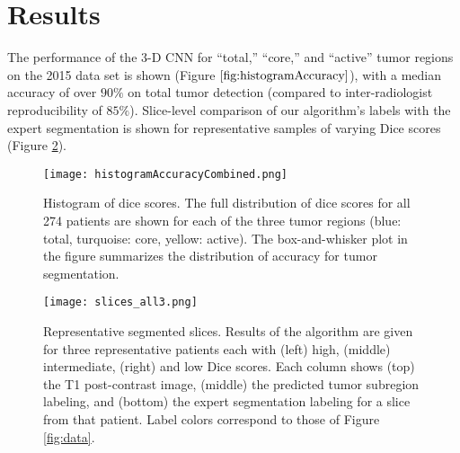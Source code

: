 \documentclass{llncs}
\begin{document}
\section{Results}
The performance of the 3-D CNN  for ``total,'' ``core,'' and ``active'' tumor regions on the 2015 data set is shown (Figure $\ref{fig:histogramAccuracy}$), with a median accuracy of over $90\%$ on total tumor detection (compared to inter-radiologist reproducibility of $85\%$).  Slice-level comparison of our algorithm's labels with the expert segmentation is shown for representative samples of varying Dice scores (Figure \ref{fig:results}). \\
\begin{figure}[htb]
	\centering
	\texttt{[image: histogramAccuracyCombined.png]}
	\caption{{Histogram of dice scores.} \small{The full distribution of dice scores for all 274 patients are shown for each of the three tumor regions (blue: total, turquoise: core, yellow: active). The box-and-whisker plot in the figure summarizes the distribution of accuracy for tumor segmentation.}}
	\label{fig:histogramAccuracy}
\end{figure}
%
%
\begin{figure}[htb]
	\centering
	\texttt{[image: slices\_all3.png]}
	\caption{{Representative segmented slices.} \small{Results of the algorithm are given for three representative patients each with (left) high, (middle) intermediate, (right) and low Dice scores. Each column shows (top) the T1 post-contrast image, (middle) the predicted tumor subregion labeling, and (bottom) the expert segmentation labeling for a slice from that patient.  Label colors correspond to those of Figure \ref{fig:data}. \\}}
	\label{fig:results}
\end{figure}
\end{document}
